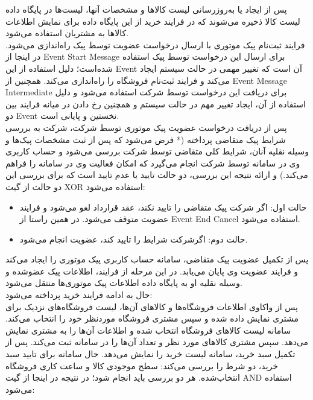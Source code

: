 \documentclass[14pt]{article}
\begin{document}
پس از ایجاد یا به‌روزرسانی لیست کالاها و مشخصات آنها، لیست‌ها در پایگاه داده لیست کالا ذخیره می‌شوند که در فرایند خرید از این پایگاه داده برای نمایش اطلاعات کالا‌ها به مشتریان استفاده می‌شود. \\
فرایند ثبت‌نام پیک موتوری با ارسال درخواست عضویت توسط پیک راه‌اندازی می‌شود. در اینجا از Event Start Message برای ارسال این درخواست توسط پیک استفاده شده‌است؛ دلیل استفاده از این Event آن است که تغییر مهمی در حالت سیستم ایجاد می‌کند و فرایند ثبت‌نام فروشگاه را راه‌اندازی می‌کند. همچنین از Event Message Intermediate برای دریافت این درخواست توسط شرکت استفاده می‌شود و دلیل استفاده از آن، ایجاد تغییر مهم در حالت سیستم و همچنین رخ دادن در میانه فرایند بین دو Event نخستین و پایانی است.\\
پس از دریافت درخواست عضویت پیک موتوری توسط شرکت، شرکت به بررسی شرایط پیک متقاضی پرداخته (* فرض می‌شود که پس از ثبت مشخصات پیک‌ها و وسیله نقلیه آنان، شرایط کلی متقاضی توسط شرکت بررسی می‌شود و حساب کاربری وی در سامانه توسط شرکت انجام می‌گیرد که امکان فعالیت وی در سامانه را فراهم می‌کند.) و ارائه نتیجه این بررسی، دو حالت تایید یا عدم تایید است که برای بررسی این دو حالت از گیت XOR استفاده می‌شود:
\begin{flushright}
\begin{itemize}
\item حالت اول: اگر شرکت پیک متقاضی را تایید نکند، عقد قرارداد لغو می‌شود و فرایند عضویت متوقف می‌شود. در همین راستا از Event End Cancel استفاده می‌شود.
\item حالت دوم: اگرشرکت شرایط را تایید کند، عضویت انجام می‌شود. 
\end{itemize}
\end{flushright}

پس از تکمیل عضویت پیک متقاضی، سامانه حساب کاربری پیک موتوری را ایجاد می‌کند و فرایند عضویت وی پایان می‌یابد. در این مرحله از فرایند، اطلاعات پیک عضوشده و وسیله نقلیه او به پایگاه داده اطلاعات پیک موتوری‌ها منتقل می‌شود. 
\\
حال به ادامه فرایند خرید پرداخته می‌شود:\\
پس از واکاوی اطلاعات فروشگاه‌ها و کالاهای آن‌ها،‌ لیست فروشگاه‌های نزدیک برای مشتری نمایش داده شده  و سپس مشتری فروشگاه موردنظر خود را انتخاب می‌کند. سامانه لیست کالاهای فروشگاه انتخاب شده و اطلاعات آن‌ها را به مشتری نمایش می‌دهد. سپس مشتری کالاهای مورد نظر و تعداد آن‌ها را در سامانه ثبت می‌کند. پس از تکمیل سبد خرید، سامانه لیست خرید را نمایش می‌دهد. حال سامانه برای تایید سبد خرید، دو شرط را بررسی می‌کند: سطح موجودی کالا و ساعت کاری فروشگاه انتخاب‌شده. هر دو بررسی باید انجام شود؛ در نتیجه در اینجا از گیت AND استفاده می‌شود:
\end{document}
